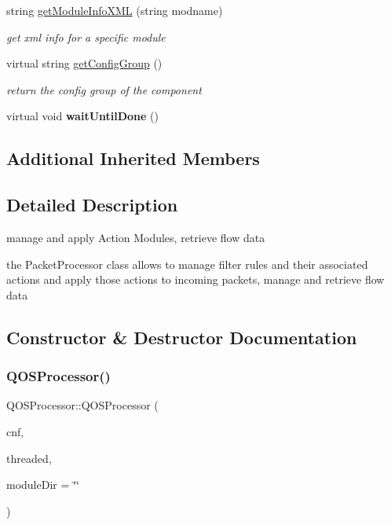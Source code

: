 \begin{DoxyCompactItemize}
\mbox{\label{classQOSProcessor_ad294917f7d2690fd755067bf36104cac}} 
string \hyperlink{classQOSProcessor_ad294917f7d2690fd755067bf36104cac}{get\+Module\+Info\+X\+ML} (string modname)
\begin{DoxyCompactList}\small\item\em get xml info for a specific module \end{DoxyCompactList}\item 
\mbox{\label{classQOSProcessor_a8c7e40e85fa1b02b61a6218281ccb736}} 
virtual string \hyperlink{classQOSProcessor_a8c7e40e85fa1b02b61a6218281ccb736}{get\+Config\+Group} ()
\begin{DoxyCompactList}\small\item\em return the config group of the component \end{DoxyCompactList}\item 
\mbox{\label{classQOSProcessor_afdc5230a402875b43ed3633621b151e2}} 
virtual void {\bfseries wait\+Until\+Done} ()
\end{DoxyCompactItemize}
\subsection*{Additional Inherited Members}


\subsection{Detailed Description}
manage and apply Action Modules, retrieve flow data 

the Packet\+Processor class allows to manage filter rules and their associated actions and apply those actions to incoming packets, manage and retrieve flow data 

\subsection{Constructor \& Destructor Documentation}
\mbox{\label{classQOSProcessor_a27b56d900e42f99fea52c93e8a720bf5}} 
\subsubsection{\texorpdfstring{Q\+O\+S\+Processor()}{QOSProcessor()}}
{\footnotesize\ttfamily Q\+O\+S\+Processor\+::\+Q\+O\+S\+Processor (\begin{DoxyParamCaption}\item[{\hyperlink{classConfigManager}{Config\+Manager} $\ast$}]{cnf,  }\item[{int}]{threaded,  }\item[{string}]{module\+Dir = {\ttfamily \char`\"{}\char`\"{}} }\end{DoxyParamCaption})}



